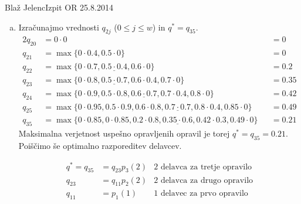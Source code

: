 \begin{naloga}{Blaž Jelenc}{Izpit OR 25.8.2014}
\begin{odgovor}
\begin{enumerate}[(a)]
\item Izračunajmo vrednosti $q_{2j}$ ($0 \le j \le w$) in $q^* = q_{35}$.
\begin{alignat*}{2}
q_{20} &= 0 \cdot 0 &&= 0 \\
q_{21} &= \max\{0 \cdot 0.4, 0.5 \cdot 0\} &&= 0 \\
q_{22} &= \max\{0 \cdot 0.7, \underline{0.5 \cdot 0.4}, 0.6 \cdot 0\} &&= 0.2 \\
q_{23} &= \max\{0 \cdot 0.8, \underline{0.5 \cdot 0.7}, 0.6 \cdot 0.4, 0.7 \cdot 0\} &&= 0.35 \\
q_{24} &= \max\{0 \cdot 0.9, 0.5 \cdot 0.8, \underline{0.6 \cdot 0.7}, 0.7 \cdot 0.4, 0.8 \cdot 0\} &&= 0.42 \\
q_{25} &= \max\{0 \cdot 0.95, 0.5 \cdot 0.9, 0.6 \cdot 0.8, \underline{0.7 \cdot 0.7}, 0.8 \cdot 0.4, 0.85 \cdot 0\} &&= 0.49 \\
q_{35} &= \max\{0 \cdot 0.85, 0 \cdot 0.85, 0.2 \cdot 0.8, \underline{0.35 \cdot 0.6}, 0.42 \cdot 0.3, 0.49 \cdot 0\} &&= 0.21
\end{alignat*}
Maksimalna verjetnost uspešno opravljenih opravil
je torej $q^* = q_{35} = 0.21$.
Poiščimo še optimalno razporeditev delavcev.

\begin{align*}
q^* = q_{35} &= q_{23} p_3(2) & \text{$2$ delavca za tretje opravilo} \\
q_{23} &= q_{11} p_2(2) & \text{$2$ delavca za drugo opravilo} \\
q_{11} &= p_1(1) & \text{$1$ delavec za prvo opravilo}
\end{align*}
\end{enumerate}
\end{odgovor}
\end{naloga}
